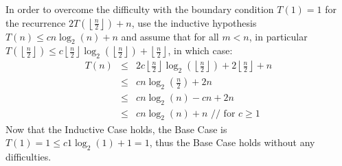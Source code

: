 In order to overcome the difficulty with the boundary condition $T(1) = 1$ for the recurrence $2T\left(\left\lfloor \frac{n}{2} \right\rfloor\right) + n$, use the inductive hypothesis $T(n) \leq cn \log_2(n) + n$ and assume that for all $m < n$, in particular $T\left(\left\lfloor \frac{n}{2} \right\rfloor\right) \leq c \left\lfloor \frac{n}{2} \right\rfloor \log_2 \left(\left\lfloor \frac{n}{2} \right\rfloor\right) + \left\lfloor \frac{n}{2} \right\rfloor$, in which case:
\begin{eqnarray*}
	T(n) &\leq& 2c\left\lfloor \frac{n}{2} \right\rfloor \log_2\left(\left\lfloor \frac{n}{2} \right\rfloor\right) + 2\left\lfloor \frac{n}{2} \right\rfloor + n \\
	 &\leq& cn\log_2\left(\frac{n}{2}\right) + 2n \\
	 &\leq& cn\log_2(n) - cn + 2n \\
	 &\leq& cn\log_2(n) + n \text{ // for $c \geq 1$}
\end{eqnarray*}
Now that the Inductive Case holds, the Base Case is $T(1) = 1 \leq c1\log_2(1) + 1 = 1$, thus the Base Case holds without any difficulties.
